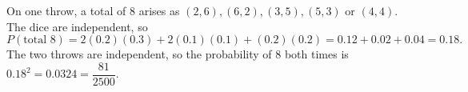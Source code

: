 On one throw, a total of $8$ arises as $(2,6),(6,2),(3,5),(5,3)$ or $(4,4)$. The dice are independent, so
\[
P(\text{total }8)=2(0.2)(0.3)+2(0.1)(0.1)+(0.2)(0.2)=0.12+0.02+0.04=0.18 .
\]
The two throws are independent, so the probability of $8$ both times is $0.18^2=\boxed{0.0324}=\dfrac{81}{2500}$.
